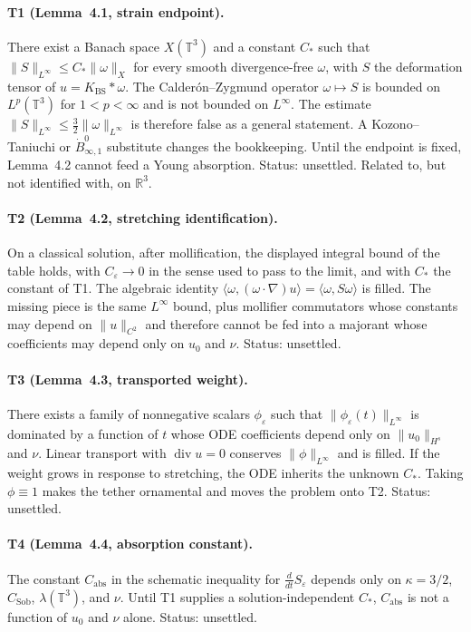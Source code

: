 \documentclass[11pt,a4paper]{article}
\theoremstyle{definition}
\theoremstyle{remark}
\newcommand{\R}{\mathbb{R}}
\newcommand{\T}{\mathbb{T}}
\newcommand{\Hs}{H^{s}}
\newcommand{\lean}[1]{\texttt{\detokenize{#1}}}
\begin{document}
\paragraph{T1 (Lemma~4.1, strain endpoint).}
There exist a Banach space $X(\T^3)$ and a constant $C_{\ast}$ such that $\|S\|_{L^\infty}\le C_{\ast}\|\omega\|_{X}$ for every smooth divergence-free $\omega$, with $S$ the deformation tensor of $u=K_{\mathrm{BS}}\ast\omega$. The Calder\'on--Zygmund operator $\omega\mapsto S$ is bounded on $L^{p}(\T^3)$ for $1<p<\infty$ and is not bounded on $L^\infty$. The estimate $\|S\|_{L^\infty}\le\tfrac32\|\omega\|_{L^\infty}$ is therefore false as a general statement. A Kozono--Taniuchi or $\dot B^{0}_{\infty,1}$ substitute changes the bookkeeping. Until the endpoint is fixed, Lemma~4.2 cannot feed a Young absorption. Status: unsettled. Related to, but not identified with, \lean{StrainControlledByVorticity} on $\R^3$.

\paragraph{T2 (Lemma~4.2, stretching identification).}
On a classical solution, after mollification, the displayed integral bound of the table holds, with $C_{\varepsilon}\to 0$ in the sense used to pass to the limit, and with $C_{\ast}$ the constant of T1. The algebraic identity $\langle\omega,(\omega\cdot\nabla)u\rangle=\langle\omega,S\omega\rangle$ is filled. The missing piece is the same $L^\infty$ bound, plus mollifier commutators whose constants may depend on $\|u\|_{C^{2}}$ and therefore cannot be fed into a majorant whose coefficients may depend only on $u_0$ and $\nu$. Status: unsettled.

\paragraph{T3 (Lemma~4.3, transported weight).}
There exists a family of nonnegative scalars $\phi_{\varepsilon}$ such that $\|\phi_{\varepsilon}(t)\|_{L^\infty}$ is dominated by a function of $t$ whose ODE coefficients depend only on $\|u_0\|_{\Hs}$ and $\nu$. Linear transport with $\operatorname{div}u=0$ conserves $\|\phi\|_{L^\infty}$ and is filled. If the weight grows in response to stretching, the ODE inherits the unknown $C_{\ast}$. Taking $\phi\equiv 1$ makes the tether ornamental and moves the problem onto T2. Status: unsettled.

\paragraph{T4 (Lemma~4.4, absorption constant).}
The constant $C_{\mathrm{abs}}$ in the schematic inequality for $\frac{d}{dt}S_{\varepsilon}$ depends only on $\kappa=3/2$, $C_{\mathrm{Sob}}$, $\lambda(\T^3)$, and $\nu$. Until T1 supplies a solution-independent $C_{\ast}$, $C_{\mathrm{abs}}$ is not a function of $u_0$ and $\nu$ alone. Status: unsettled.
\end{document}
